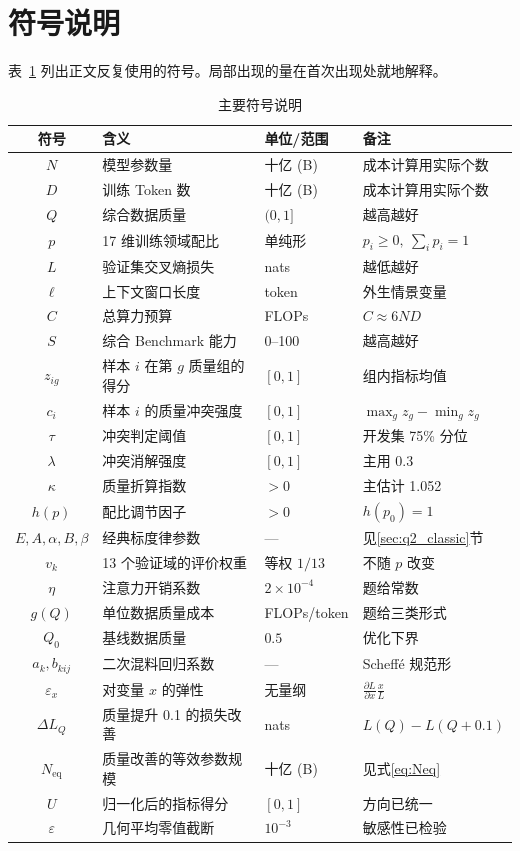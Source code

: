 \section{符号说明}

表~\ref{tab:symbols} 列出正文反复使用的符号。局部出现的量在首次出现处就地解释。

\begin{table}[htbp]
\centering
\caption{主要符号说明}
\label{tab:symbols}
\small
\begin{tabular}{c|l|l|l}
\toprule
\textbf{符号} & \textbf{含义} & \textbf{单位/范围} & \textbf{备注} \\
\midrule
$N$ & 模型参数量 & 十亿 (B) & 成本计算用实际个数 \\
$D$ & 训练 Token 数 & 十亿 (B) & 成本计算用实际个数 \\
$Q$ & 综合数据质量 & $(0,1]$ & 越高越好 \\
$p$ & 17 维训练领域配比 & 单纯形 & $p_i\ge0,\ \sum_i p_i=1$ \\
$L$ & 验证集交叉熵损失 & nats & 越低越好 \\
$\ell$ & 上下文窗口长度 & token & 外生情景变量 \\
$C$ & 总算力预算 & FLOPs & $C\approx6ND$ \\
$S$ & 综合 Benchmark 能力 & 0--100 & 越高越好 \\
$z_{ig}$ & 样本 $i$ 在第 $g$ 质量组的得分 & $[0,1]$ & 组内指标均值 \\
$c_i$ & 样本 $i$ 的质量冲突强度 & $[0,1]$ & $\max_g z_g-\min_g z_g$ \\
$\tau$ & 冲突判定阈值 & $[0,1]$ & 开发集 75\% 分位 \\
$\lambda$ & 冲突消解强度 & $[0,1]$ & 主用 0.3 \\
$\kappa$ & 质量折算指数 & $>0$ & 主估计 1.052 \\
$h(p)$ & 配比调节因子 & $>0$ & $h(p_0)=1$ \\
$E,A,\alpha,B,\beta$ & 经典标度律参数 & --- & 见\ref{sec:q2_classic}节 \\
$v_k$ & 13 个验证域的评价权重 & 等权 $1/13$ & 不随 $p$ 改变 \\
$\eta$ & 注意力开销系数 & $2\times10^{-4}$ & 题给常数 \\
$g(Q)$ & 单位数据质量成本 & FLOPs/token & 题给三类形式 \\
$Q_0$ & 基线数据质量 & $0.5$ & 优化下界 \\
$a_k,b_{kij}$ & 二次混料回归系数 & --- & Scheffé 规范形 \\
$\varepsilon_x$ & 对变量 $x$ 的弹性 & 无量纲 & $\frac{\partial L}{\partial x}\frac{x}{L}$ \\
$\Delta L_Q$ & 质量提升 0.1 的损失改善 & nats & $L(Q)-L(Q+0.1)$ \\
$N_{\mathrm{eq}}$ & 质量改善的等效参数规模 & 十亿 (B) & 见式\eqref{eq:Neq} \\
$U$ & 归一化后的指标得分 & $[0,1]$ & 方向已统一 \\
$\varepsilon$ & 几何平均零值截断 & $10^{-3}$ & 敏感性已检验 \\
\bottomrule
\end{tabular}
\end{table}

